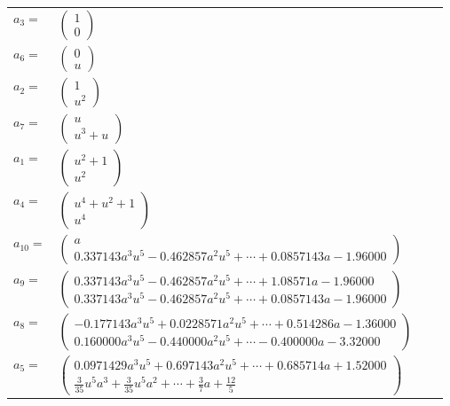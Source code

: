\documentclass[1p]{elsarticle_modified}
\theoremstyle{definition}
\begin{document}
\begin{tabular}{m{7pt} m{180pt} m{7pt} m{180pt} }
\flushright $a_{3}=$&$\begin{pmatrix}1\\0\end{pmatrix}$ \\
\flushright $a_{6}=$&$\begin{pmatrix}0\\u\end{pmatrix}$ \\
\flushright $a_{2}=$&$\begin{pmatrix}1\\u^2\end{pmatrix}$ \\
\flushright $a_{7}=$&$\begin{pmatrix}u\\u^3+u\end{pmatrix}$ \\
\flushright $a_{1}=$&$\begin{pmatrix}u^2+1\\u^2\end{pmatrix}$ \\
\flushright $a_{4}=$&$\begin{pmatrix}u^4+u^2+1\\u^4\end{pmatrix}$ \\
\flushright $a_{10}=$&$\begin{pmatrix}a\\0.337143 a^{3} u^{5}-0.462857 a^{2} u^{5}+\cdots+0.0857143 a-1.96000\end{pmatrix}$ \\
\flushright $a_{9}=$&$\begin{pmatrix}0.337143 a^{3} u^{5}-0.462857 a^{2} u^{5}+\cdots+1.08571 a-1.96000\\0.337143 a^{3} u^{5}-0.462857 a^{2} u^{5}+\cdots+0.0857143 a-1.96000\end{pmatrix}$ \\
\flushright $a_{8}=$&$\begin{pmatrix}-0.177143 a^{3} u^{5}+0.0228571 a^{2} u^{5}+\cdots+0.514286 a-1.36000\\0.160000 a^{3} u^{5}-0.440000 a^{2} u^{5}+\cdots-0.400000 a-3.32000\end{pmatrix}$ \\
\flushright $a_{5}=$&$\begin{pmatrix}0.0971429 a^{3} u^{5}+0.697143 a^{2} u^{5}+\cdots+0.685714 a+1.52000\\\frac{3}{35} u^5 a^3+\frac{3}{35} u^5 a^2+\cdots+\frac{3}{7} a+\frac{12}{5}\end{pmatrix}$ \\

\end{tabular}
\end{document}
